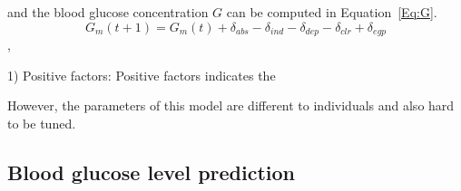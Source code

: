 and the blood glucose concentration $G$ can be computed in Equation~\ref{Eq:G}.
\begin{equation}\label{Eq:G}
G_m(t+1)=G_m(t)+\delta_{abs}-\delta_{ind}-\delta_{dep}-\delta_{clr}+\delta_{egp}
\end{equation},


1) Positive factors:
Positive factors indicates the

However, the parameters of this model are different to individuals and also hard to be tuned.

\subsection{Blood glucose level prediction}


